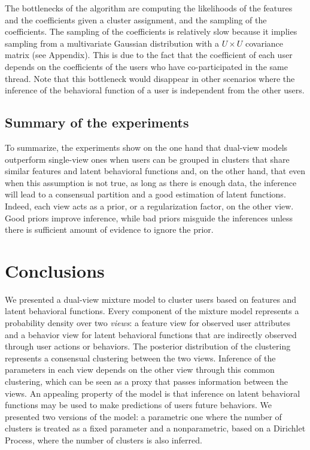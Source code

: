 \documentclass[smallextended]{svjour3}          %
\begin{document}
The bottlenecks of the algorithm are computing the likelihoods of the features and the coefficients given a cluster assignment, and the sampling of the coefficients. The sampling of the coefficients is relatively slow because it implies sampling from a multivariate Gaussian distribution with a $U\times U$ covariance matrix (see Appendix). This is due to the fact that the coefficient of each user depends on the coefficients of the users who have co-participated in the same thread. Note that this bottleneck would disappear in other scenarios where the inference of the behavioral function of a user is independent from the other users.


\subsection{Summary of the experiments}
To summarize, the experiments show on the one hand that dual-view models outperform single-view ones when users can be grouped in clusters that share similar features and latent behavioral functions and, on the other hand, that even when this assumption is not true, as long as there is enough data, the inference will lead to a consensual partition and a good estimation of latent functions. Indeed, each view acts as a prior, or a regularization factor, on the other view. Good priors improve inference, while bad priors misguide the inferences unless there is sufficient amount of evidence to ignore the prior.

\section{Conclusions}\label{sec:conclusions}

We presented a dual-view mixture model to cluster users based on features and latent behavioral functions. Every component of the mixture model represents a probability density over two \textit{views}: a feature view for observed user attributes and a
behavior view for latent behavioral functions that are indirectly observed through user actions or behaviors. The posterior distribution of the clustering represents a consensual clustering between the two views. Inference of the parameters in each view depends on the other view through this common clustering, which can be seen as a proxy that passes information between the views. An appealing property of the model is that inference on latent behavioral functions may be used to make predictions of users future behaviors. We presented two versions of the model: a parametric one where the number of clusters is treated as a fixed parameter and a nonparametric, based on a Dirichlet Process, where the number of clusters is also inferred.
\end{document}
